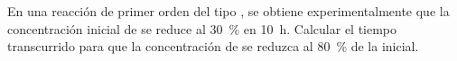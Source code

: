 En una reacción de primer orden del tipo , se obtiene experimentalmente que la concentración inicial de  se reduce al \SI{30}{\percent} en \SI{10}{\hour}. Calcular el tiempo transcurrido para que la concentración de  se reduzca al \SI{80}{\percent} de la inicial.
